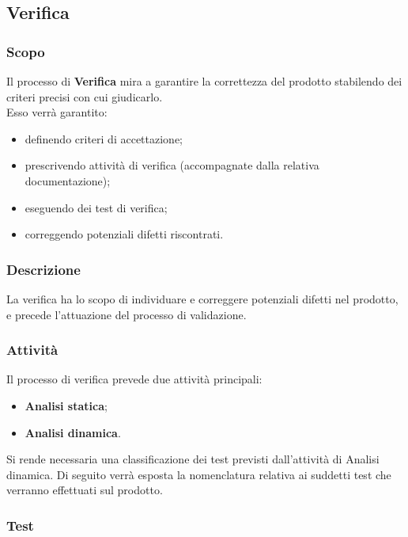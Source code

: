 \subsection{Verifica}
		\subsubsection{Scopo}
		Il processo di \textbf{Verifica} mira a garantire la correttezza del prodotto stabilendo dei criteri precisi con cui giudicarlo. \\ Esso verrà garantito:
		\begin{itemize}
			\item definendo criteri di accettazione;
			\item prescrivendo attività di verifica (accompagnate dalla relativa documentazione);
			\item eseguendo dei test di verifica;
			\item correggendo potenziali difetti riscontrati.
		\end{itemize}

		\subsubsection{Descrizione}
		La verifica ha lo scopo di individuare e correggere potenziali difetti nel prodotto, e precede l'attuazione del processo di validazione.
		
		\subsubsection{Attività}
		Il processo di verifica prevede due attività principali:
		\begin{itemize}
			\item \textbf{Analisi statica};
			\item \textbf{Analisi dinamica}.
		\end{itemize}
		
		Si rende necessaria una classificazione dei test previsti dall'attività di Analisi dinamica. Di seguito verrà esposta la nomenclatura relativa ai suddetti test che verranno effettuati sul prodotto.
		
		\subsubsection{Test}
		
